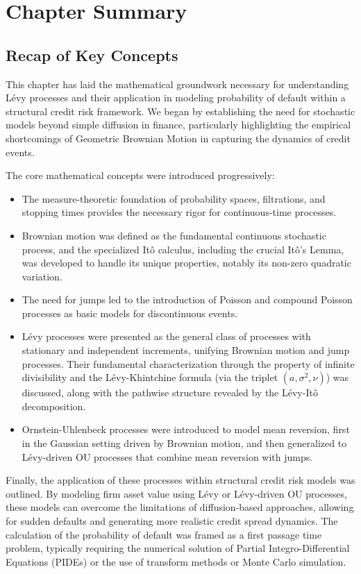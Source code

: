 \documentclass[11pt,twoside,openright]{report}
\begin{document}
\section{Chapter Summary}
\label{sec:summary_roadmap}

\subsection{Recap of Key Concepts}
\label{subsec:recap}

This chapter has laid the mathematical groundwork necessary for understanding Lévy processes and their application in modeling probability of default within a structural credit risk framework. We began by establishing the need for stochastic models beyond simple diffusion in finance, particularly highlighting the empirical shortcomings of Geometric Brownian Motion in capturing the dynamics of credit events.

The core mathematical concepts were introduced progressively:
\begin{itemize}
    \item The measure-theoretic foundation of probability spaces, filtrations, and stopping times provides the necessary rigor for continuous-time processes.
    \item Brownian motion was defined as the fundamental continuous stochastic process, and the specialized Itô calculus, including the crucial Itô's Lemma, was developed to handle its unique properties, notably its non-zero quadratic variation.
    \item The need for jumps led to the introduction of Poisson and compound Poisson processes as basic models for discontinuous events.
    \item Lévy processes were presented as the general class of processes with stationary and independent increments, unifying Brownian motion and jump processes. Their fundamental characterization through the property of infinite divisibility and the Lévy-Khintchine formula (via the triplet $(a, \sigma^2, \nu)$) was discussed, along with the pathwise structure revealed by the Lévy-Itô decomposition.
    \item Ornstein-Uhlenbeck processes were introduced to model mean reversion, first in the Gaussian setting driven by Brownian motion, and then generalized to Lévy-driven OU processes that combine mean reversion with jumps.
\end{itemize}
Finally, the application of these processes within structural credit risk models was outlined. By modeling firm asset value using Lévy or Lévy-driven OU processes, these models can overcome the limitations of diffusion-based approaches, allowing for sudden defaults and generating more realistic credit spread dynamics. The calculation of the probability of default was framed as a first passage time problem, typically requiring the numerical solution of Partial Integro-Differential Equations (PIDEs) or the use of transform methods or Monte Carlo simulation.
\end{document}
